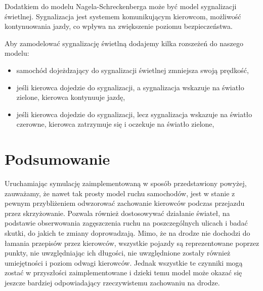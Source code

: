 \documentclass{sprawozdanie-agh}
\begin{document}
\begin{multicols}{2}
		Dodatkiem do modelu Nagela-Schreckenberga może być model sygnalizacji świetlnej. Sygnalizacja jest systemem komunikującym kierowcom, możliwość kontynuowania jazdy, co wpływa na zwiększenie poziomu bezpieczeństwa.

		Aby zamodelować sygnalizację świetlną dodajemy kilka rozszeżeń do naszego modelu:
		\begin{itemize}
			\item samochód dojeżdzający do sygnalizacji świetlnej zmniejsza swoją prędkość,
			\item jeśli kierowca dojedzie do sygnalizacji, a sygnalizacja wskazuje na światło zielone, kierowca kontynuuje jazdę,
			\item jeśli kierowca dojedzie do sygnalizacji, lecz sygnalizacja wskazuje na światło czerowne, kierowca zatrzymuje się i oczekuje na światło zielone,
		\end{itemize}

	
	\section{Podsumowanie}

		Uruchamiając symulację zaimplementowaną w sposób przedstawiony powyżej, zauważamy, że nawet tak prosty model ruchu samochodów, jest w stanie z pewnym przybliżeniem odwzorować zachowanie kierowców podczas przejazdu przez skrzyżowanie. Pozwala również dostosowywać działanie świateł, na podstawie obserwowania zagęszczenia ruchu na poszczególnych ulicach i badać skutki, do jakich te zmiany doprowadzają. Mimo, że na drodze nie dochodzi do łamania przepisów przez kierowców, wszystkie pojazdy są reprezentowane poprzez punkty, nie uwzględniając ich długości, nie uwzględnione zostały również umiejętności i poziom odwagi kierowców. Jednak wszystkie te czynniki mogą zostać w przyszłości zaimplementowane i dzieki temu model może okazać się jeszcze bardziej odpowiadający rzeczywistemu zachowaniu na drodze. 
		

	\end{multicols}
\end{document}
